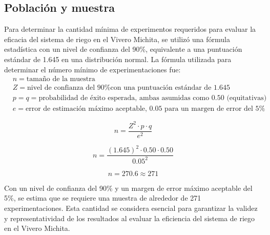 
\subsection{Población y muestra}
Para determinar la cantidad mínima de experimentos requeridos para evaluar la eficacia del sistema de riego en el Vivero Michita, se utilizó una fórmula estadística con un nivel de confianza del 90\%, equivalente a una puntuación estándar de 1.645 en una distribución normal.
\bigbreak
La fórmula utilizada para determinar el número mínimo de experimentaciones fue:
\begin{align*}
     & n = \text{tamaño de la muestra}                                                                       \\
     & Z = \text{nivel de confianza del 90\% con una puntuación estándar de 1.645} \\
     & p = q = \text{probabilidad de éxito esperada, ambas asumidas como 0.50 (equitativas)}                 \\
     & e = \text{error de estimación máximo aceptable, 0.05 para un margen de error del 5\%}
\end{align*}

\[ n = \frac{{Z^2 \cdot p \cdot q}}{{e^2}} \]

\[ n = \frac{(1.645)^2 \cdot 0.50 \cdot 0.50}{0.05^2} \]

\[ n = 270.6 \approx 271 \]

Con un nivel de confianza del 90\% y un margen de error máximo aceptable del 5\%, se estima que se requiere una muestra de alrededor de 271 experimentaciones. Esta cantidad se considera esencial para garantizar la validez y representatividad de los resultados al evaluar la eficiencia del sistema de riego en el Vivero Michita.

